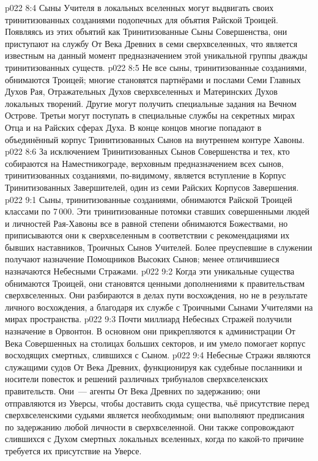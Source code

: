 \vs p022 8:4 Сыны Учителя в локальных вселенных могут выдвигать своих тринитизованных созданиями подопечных для объятия Райской Троицей. Появляясь из этих объятий как Тринитизованные Сыны Совершенства, они приступают на службу От Века Древних в семи сверхвселенных, что является известным на данный момент предназначением этой уникальной группы дважды тринитизованных существ.
\vs p022 8:5 Не все сыны, тринитизованные созданиями, обнимаются Троицей; многие становятся партнёрами и послами Семи Главных Духов Рая, Отражательных Духов сверхвселенных и Материнских Духов локальных творений. Другие могут получить специальные задания на Вечном Острове. Третьи могут поступать в специальные службы на секретных мирах Отца и на Райских сферах Духа. В конце концов многие попадают в объединённый корпус Тринитизованных Сынов на внутреннем контуре Хавоны.
\vs p022 8:6 За исключением Тринитизованных Сынов Совершенства и тех, кто собираются на Наместникограде, верховным предназначением всех сынов, тринитизованных созданиями, по\hyp{}видимому, является вступление в Корпус Тринитизованных Завершителей, один из семи Райских Корпусов Завершения.
\vs p022 9:1 Сыны, тринитизованные созданиями, обнимаются Райской Троицей классами по 7\,000. Эти тринитизованные потомки ставших совершенными людей и личностей Рая\hyp{}Хавоны все в равной степени обнимаются Божествами, но приписываются они к сверхвселенным в соответствии с рекомендациями их бывших наставников, Троичных Сынов Учителей. Более преуспевшие в служении получают назначение Помощников Высоких Сынов; менее отличившиеся назначаются Небесными Стражами.
\vs p022 9:2 Когда эти уникальные существа обнимаются Троицей, они становятся ценными дополнениями к правительствам сверхвселенных. Они разбираются в делах пути восхождения, но не в результате личного восхождения, а благодаря их службе с Троичными Сынами Учителями на мирах пространства.
\vs p022 9:3 \pc Почти миллиард Небесных Стражей получили назначение в Орвонтон. В основном они прикрепляются к администрации От Века Совершенных на столицах больших секторов, и им умело помогает корпус восходящих смертных, слившихся с Сыном.
\vs p022 9:4 Небесные Стражи являются служащими судов От Века Древних, функционируя как судебные посланники и носители повесток и решений различных трибуналов сверхвселенских правительств. Они~--- агенты От Века Древних по задержанию; они отправляются из Уверсы, чтобы доставить сюда существа, чьё присутствие перед сверхвселенскими судьями является необходимым; они выполняют предписания по задержанию любой личности в сверхвселенной. Они также сопровождают слившихся с Духом смертных локальных вселенных, когда по какой\hyp{}то причине требуется их присутствие на Уверсе.
